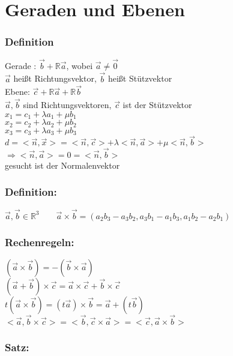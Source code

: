 \section{Geraden und Ebenen}
\subsubsection{Definition}
Gerade : $\vec{b} + \mathbb{R}\vec{a}$, wobei $\vec{a}\neq\vec{0}$\\
 $\vec{a}$ heißt Richtungsvektor, $\vec{b}$ heißt Stützvektor\\
Ebene: $\vec{c}+\mathbb{R}\vec{a}+\mathbb{R}\vec{b}$\\
$\vec{a}, \vec{b}$ sind Richtungsvektoren, $\vec{c}$ ist der Stützvektor\\
%
%
%
$x_{1}=c_{1}+\lambda a_{1}+\mu b_{1}$\\
$x_{2}=c_{2}+\lambda a_{2}+\mu b_{2}$\\
$x_{3}=c_{3}+\lambda a_{3}+\mu b_{3}$\\

$d=<\vec{n},\vec{x}>=<\vec{n},\vec{c}>+\lambda<\vec{n},\vec{a}>+\mu<\vec{n},\vec{b}>$\\
$\Rightarrow <\vec{n},\vec{a}>=0=<\vec{n},\vec{b}>$\\
gesucht ist der Normalenvektor
%
%
%
\subsubsection{Definition:}
$\vec{a},\vec{b} \in \mathbb{R}^{3} \qquad \vec{a} \times \vec{b} = (a_{2}b_{3}-a_{3}b_{2},a_{3}b_{1}-a_{1}b_{3}, a_{1}b_{2}-a_{2}b_{1})$
%
%
%
\subsubsection{Rechenregeln:}
$(\vec{a}\times\vec{b})=-(\vec{b}\times\vec{a})$\\
$(\vec{a}+\vec{b})\times\vec{c}=\vec{a}\times\vec{c}+\vec{b}\times\vec{c}$\\
$t(\vec{a}\times\vec{b})=(t\vec{a})\times\vec{b}=\vec{a}+(t\vec{b})$\\
$<\vec{a},\vec{b}\times\vec{c}>=<\vec{b},\vec{c}\times\vec{a}>=<\vec{c},\vec{a}\times\vec{b}>$
%
%
%
\subsubsection{Satz:}